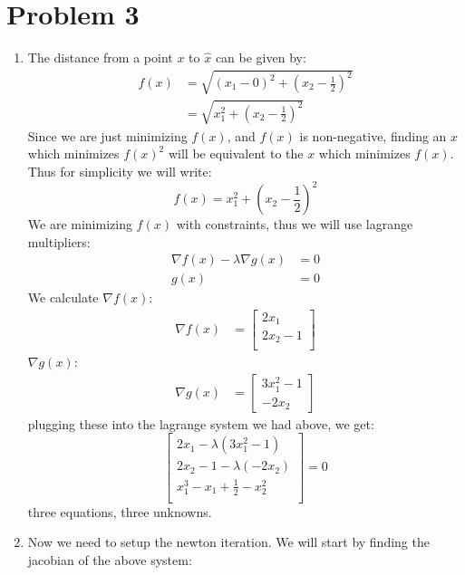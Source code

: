 \documentclass{article}
\begin{document}
\section*{Problem 3}
\begin{enumerate}[label=\alph*.)]
\item The distance from a point $x$ to $\hat{x}$ can be given by: \\
\begin{align*}
f(x) &= \sqrt{(x_1 -  0)^2 + (x_2 - \frac{1}{2})^2}\\
&= \sqrt{x_1^2 + (x_2 - \frac{1}{2})^2}
\end{align*}
Since we are just minimizing $f(x)$, and $f(x)$ is non-negative, finding an $x$ which minimizes $f(x)^2$ will be equivalent to the $x$ which minimizes $f(x)$. Thus for simplicity we will write:\\
\[
f(x) = x_1^2 + (x_2 - \frac{1}{2})^2
\]
We are minimizing $f(x)$ with constraints, thus we will use lagrange multipliers:\\
\begin{align*}
\nabla f(x) - \lambda \nabla g(x) &= 0 \\
g(x) &= 0
\end{align*}
We calculate $\nabla f(x)$: \\
\begin{align*}
\nabla f(x) &= \begin{bmatrix}
2x_1 \\
2x_2 - 1 \\
\end{bmatrix}
\end{align*}
$\nabla g(x)$: \\
\begin{align*}
\nabla g(x) &= \begin{bmatrix}
3x_1^2 - 1 \\
-2x_2
\end{bmatrix}
\end{align*}
plugging these into the lagrange system we had above, we get: \\
\[
\begin{bmatrix}
2x_1 - \lambda(3x_1^2 - 1) \\
2x_2 - 1 - \lambda(-2x_2) \\
x_1^3 - x_1 + \frac{1}{2} - x_2^2 \\
\end{bmatrix} = 0
\]
three equations, three unknowns. \\
\item Now we need to setup the newton iteration. We will start by finding the jacobian of the above system: \\

\end{enumerate}
\end{document}

